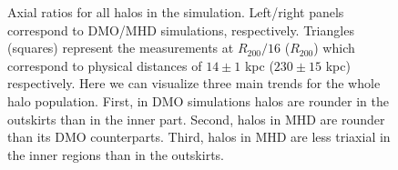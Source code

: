 \documentclass[a4paper,fleqn,usenatbib]{mnras}
\begin{document}
 
\begin{figure}
\begin{center}
\end{center}
\caption{Axial ratios for all halos in the simulation.
  Left/right panels correspond to DMO/MHD simulations, respectively.
  Triangles (squares) represent the measurements at $R_{200}/16$
  ($R_{200}$) which correspond to physical distances of $14\pm 1$ kpc
  ($230\pm 15$ kpc) respectively.
  Here we can visualize three main trends for the whole halo population.
  First, in DMO simulations halos are rounder in the outskirts
  than in the inner part.
  Second, halos in MHD are rounder than its DMO counterparts.
  Third, halos in MHD are less triaxial in the inner regions than in
  the outskirts.}
  \label{fig:triaxiality_plane}
\end{figure}
\end{document}
